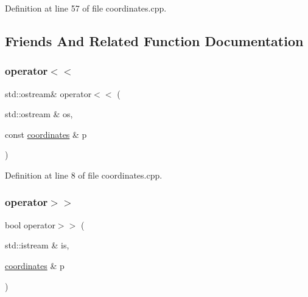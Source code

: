Definition at line 57 of file coordinates.\+cpp.



\subsection{Friends And Related Function Documentation}
\mbox{\label{structbattle__ship_1_1coordinates_a3addd697b39df26c1807d744c30e65b5}} 
\subsubsection{\texorpdfstring{operator$<$$<$}{operator<<}}
{\footnotesize\ttfamily std\+::ostream\& operator$<$$<$ (\begin{DoxyParamCaption}\item[{std\+::ostream \&}]{os,  }\item[{const \hyperlink{structbattle__ship_1_1coordinates}{coordinates} \&}]{p }\end{DoxyParamCaption})\hspace{0.3cm}{\ttfamily [friend]}}



Definition at line 8 of file coordinates.\+cpp.

\mbox{\label{structbattle__ship_1_1coordinates_afd9a944ba3ab08355a0ae36d35e57d85}} 
\subsubsection{\texorpdfstring{operator$>$$>$}{operator>>}}
{\footnotesize\ttfamily bool operator$>$$>$ (\begin{DoxyParamCaption}\item[{std\+::istream \&}]{is,  }\item[{\hyperlink{structbattle__ship_1_1coordinates}{coordinates} \&}]{p }\end{DoxyParamCaption})\hspace{0.3cm}{\ttfamily [friend]}}




